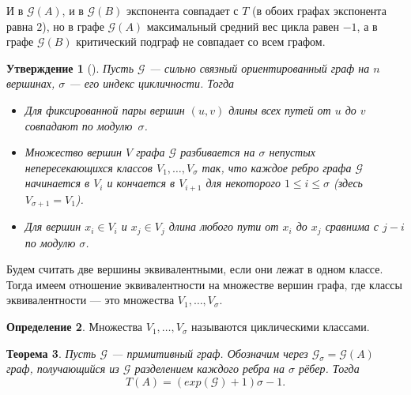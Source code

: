 \documentclass[12pt]{article}
\newtheorem{theorem}{Теорема}[section]
\newtheorem{proposition}[theorem]{Утверждение}
\theoremstyle{definition}
\newtheorem{definition}[theorem]{Определение}
\begin{document}
И в $\mathcal{G}(A)$, и в $\mathcal{G}(B)$ экспонента совпадает с $T$ (в обоих графах экспонента равна $2$), но в графе $\mathcal{G}(A)$ максимальный средний вес цикла равен $-1$, а в графе $\mathcal{G}(B)$ критический подграф не совпадает со всем графом.

\begin{proposition} [{\cite[лемма 3.4.1]{combinatorialMatrixTheory}}]
Пусть $\mathcal{G}$ --- сильно связный ориентированный граф на $n$ вершинах, $\sigma$ --- его индекс цикличности. Тогда
\begin{itemize}
\item Для фиксированной пары вершин $(u, v)$ длины всех путей от $u$ до $v$ совпадают по модулю~$\sigma$.
\item Множество вершин $V$ графа $\mathcal{G}$ разбивается на $\sigma$ непустых непересекающихся классов $V_1, \dots, V_{\sigma}$ так, что каждое ребро графа $\mathcal{G}$ начинается в $V_i$ и кончается в $V_{i + 1}$ для некоторого $1 \le i \le \sigma$ (здесь $V_{\sigma + 1} = V_1$).
\item Для вершин $x_i \in V_i$ и $x_j \in V_j$ длина любого пути от $x_i$ до $x_j$ сравнима с $j - i$ по модулю $\sigma$.
\end{itemize}
\end{proposition}

Будем считать две вершины эквивалентными, если они лежат в одном классе. Тогда имеем отношение эквивалентности на множестве вершин графа, где классы эквивалентности --- это множества $V_1, \dots, V_{\sigma}$.

\begin{definition}
Множества $V_1, \dots, V_{\sigma}$ называются циклическими классами.
\end{definition}

\begin{theorem}
\label{homothetyGraph}
Пусть $\mathcal{G}$ --- примитивный граф. Обозначим через $\mathcal{G}_{\sigma} = \mathcal{G}(A)$ граф, получающийся из $\mathcal{G}$ разделением каждого ребра на $\sigma$ рёбер. Тогда
\begin{equation*}
T(A) = (exp(\mathcal{G}) + 1)\sigma - 1.
\end{equation*}
\end{theorem}
\end{document}
